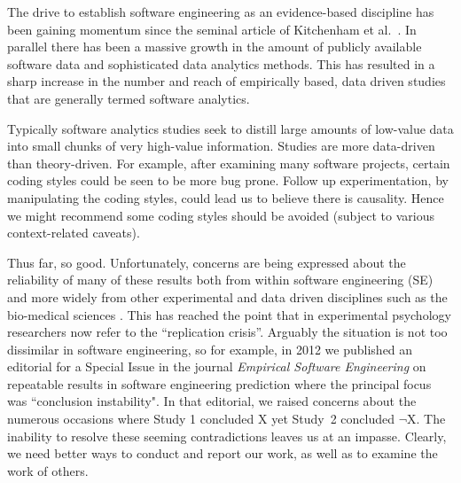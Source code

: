 \documentclass[preprint,10pt]{elsarticle}
\begin{document}
\noindent
The drive to establish software engineering as an evidence-based discipline has been gaining momentum since the seminal article of Kitchenham et al.~\cite{Kitc04}.  In parallel there has been a massive growth in the amount of publicly available software data and sophisticated data analytics methods.  This has resulted in a sharp increase in the number and reach of empirically based, data driven studies that are generally termed software analytics.

Typically software analytics studies seek to distill large amounts of low-value data into small chunks of very high-value information. Studies are more data-driven than theory-driven.  For example, after examining many software projects, certain coding styles could be seen to be more bug prone.  Follow up experimentation, by manipulating the coding styles, could lead us to believe there is causality. Hence we might recommend some coding styles should be avoided (subject to various context-related caveats). 




Thus far, so good.  Unfortunately, concerns are being expressed about the reliability of many of these results both from within software engineering (SE) \cite{Shep14,Jorg16} and more widely from other experimental and data driven disciplines such as the bio-medical sciences \cite{Ioan05,Earp15}.  This has reached the point that in experimental psychology researchers now refer to the ``replication crisis''. Arguably the situation is not too dissimilar in software engineering, so for example, in 2012 we published an editorial for a Special Issue in the journal \textit{Empirical Software Engineering} on repeatable results in software engineering prediction \cite{menzies12} where the principal focus was ``conclusion instability".  In that editorial, we raised concerns about the numerous occasions where Study 1 concluded X yet Study~2 concluded $\neg$X.  The inability to resolve these seeming contradictions leaves us at an impasse.  Clearly, we need better ways to conduct and report our work, as well as to examine the work of others.
\end{document}
